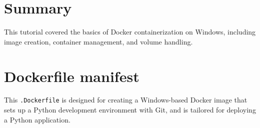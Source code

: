 \documentclass{article}
\begin{document}
\section{Summary}
This tutorial covered the basics of Docker containerization on Windows, including image creation, container management, and volume handling.

\appendix

\section{Dockerfile manifest} \label{dockerfile} 

This \texttt{.Dockerfile} is designed for creating a Windows-based Docker image that sets up a Python development environment with Git, and is tailored for deploying a Python application.
\end{document}
